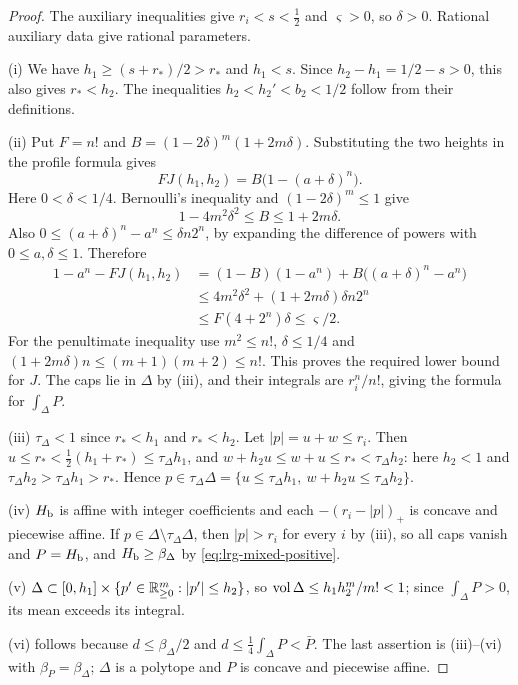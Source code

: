 \begin{proof}
The auxiliary inequalities give $r_i<s<\frac12$ and $\varsigma>0$, so $\delta>0$. Rational auxiliary data give rational parameters.

(i) We have $h_1\ge(s+r_*)/2>r_*$ and $h_1<s$.
Since $h_2-h_1=1/2-s>0$, this also gives $r_*<h_2$.
The inequalities $h_2<h_2'<b_2<1/2$ follow from their definitions.

(ii) Put $F=n!$ and $B=(1-2\delta)^m(1+2m\delta)$. Substituting the two heights in the profile formula gives
\[
 FJ(h_1,h_2)=B\bigl(1-(a+\delta)^n\bigr).
\]
Here $0<\delta<1/4$. Bernoulli's inequality and $(1-2\delta)^m\le1$ give
\[
 1-4m^2\delta^2\le B\le1+2m\delta.
\]
Also $0\le(a+\delta)^n-a^n\le\delta n2^n$, by expanding the difference of powers with
$0\le a,\delta\le1$. Therefore
\begin{align*}
 1-a^n-FJ(h_1,h_2)
 &=(1-B)(1-a^n)+B\bigl((a+\delta)^n-a^n\bigr)\\
 &\le4m^2\delta^2+(1+2m\delta)\delta n2^n\\
 &\le F(4+2^n)\delta\le\varsigma/2.
\end{align*}
For the penultimate inequality use $m^2\le n!$, $\delta\le1/4$ and
$(1+2m\delta)n\le(m+1)(m+2)\le n!$. This proves the required lower bound for $J$.
The caps lie in $\Delta$ by (iii), and their integrals are $r_i^n/n!$, giving the formula for $\int_\Delta P$.

(iii) $\tau_\Delta<1$ since $r_*<h_1$ and $r_*<h_2$. Let $|p|=u+w\le r_i$. Then $u\le r_*<\frac12(h_1+r_*)\le\tau_\Delta h_1$,
and $w+h_2u\le w+u\le r_*<\tau_\Delta h_2$: here $h_2<1$ and $\tau_\Delta h_2>\tau_\Delta h_1>r_*$. Hence $p\in\tau_\Delta\Delta=\{u\le\tau_\Delta h_1,\ w+h_2u\le\tau_\Delta h_2\}$.

(iv) $H_{\mathrm b}$ is affine with integer coefficients and each $-(r_i-|p|)_+$ is concave and piecewise affine. If
$p\in\Delta\setminus\tau_\Delta\Delta$, then $|p|>r_i$ for every $i$ by (iii), so all caps vanish and $P=H_{\mathrm b}$, and
$H_{\mathrm b}\ge\beta_\Delta$ by \eqref{eq:lrg-mixed-positive}.

(v) $\Delta\subset[0,h_1]\times\{p'\in\mathbb{R}^m_{\ge0}:|p'|\le h_2\}$, so $\operatorname{vol}\Delta\le h_1h_2^m/m!<1$; since $\int_\Delta P>0$, its mean
exceeds its integral.

(vi) follows because $d\le\beta_\Delta/2$ and
$d\le\frac14\int_\Delta P<\bar P$. The last assertion is (iii)--(vi) with $\beta_P=\beta_\Delta$; $\Delta$ is a polytope and
$P$ is concave and piecewise affine.
\end{proof}

